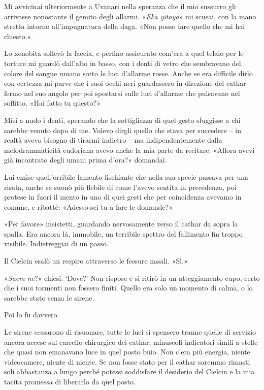 Mi avvicinai ulteriormente a Uvanari nella speranza che il mio sussurro
gli arrivasse nonostante il gemito degli allarmi. «\emph{Eka yitaya}» mi
scusai, con la mano stretta intorno all'impugnatura della daga. «Non
posso fare quello che mi hai chiesto.»

Lo xenobita sollevò la faccia, e perfino assicurato com'era a quel
telaio per le torture mi guardò dall'alto in basso, con i denti di vetro
che sembravano del colore del sangue umano sotto le luci d'allarme
rosse. Anche se era difficile dirlo con certezza mi parve che i suoi
occhi neri guardassero in direzione del cathar fermo nel suo angolo per
poi spostarsi sulle luci d'allarme che pulsavano nel soffitto. «Hai
fatto tu questo?»

Misi a nudo i denti, sperando che la sottigliezza di quel gesto
sfuggisse a chi sarebbe venuto dopo di me. Volevo dirgli quello che
stava per succedere -- in realtà avevo bisogno di tirarmi indietro -- ma
indipendentemente dalla melodrammaticità eudoriana avevo anche la mia
parte da recitare. «Allora avevi già incontrato degli umani prima
d'ora?» domandai.

Lui emise quell'orribile lamento fischiante che nella sua specie passava
per una risata, anche se suonò più flebile di come l'avevo sentita in
precedenza, poi protese in fuori il mento in uno di quei gesti che per
coincidenza avevamo in comune, e ribatté: «Adesso sei tu a fare le
domande?»

«Per favore» insistetti, guardando nervosamente verso il cathar da sopra
la spalla. Era ancora là, immobile, un terribile spettro del fallimento
fin troppo visibile. Indietreggiai di un passo.

Il Cielcin esalò un respiro attraverso le fessure nasali. «Sì.»

«\emph{Saem ne}?» chiesi. `Dove?' \emph{} Non rispose e si ritirò in un
atteggiamento cupo, certo che i suoi tormenti non fossero finiti. Quello
era solo un momento di calma, o lo sarebbe stato senza le sirene.

Poi lo fu davvero.

Le sirene cessarono di risuonare, tutte le luci si spensero tranne
quelle di servizio ancora accese sul carrello chirurgico dei cathar,
minuscoli indicatori simili a stelle che quasi non emanavano luce in
quel posto buio. Non c'era più energia, niente videocamere, niente di
niente. Se non fosse stato per il cathar saremmo rimasti soli abbastanza
a lungo perché potessi soddisfare il desiderio del Cielcin e la mia
tacita promessa di liberarlo da quel posto.

